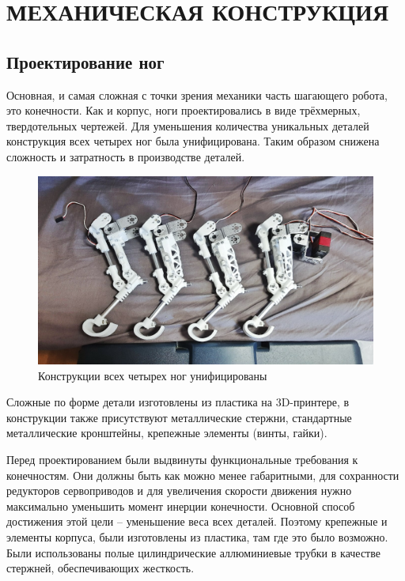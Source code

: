 \chapter{\MakeUppercase{Механическая конструкция}}
\section{Проектирование ног} \label{sec:leg_design}
Основная, и самая сложная с точки зрения механики часть шагающего робота, это конечности. Как и корпус, ноги проектировались в виде трёхмерных, твердотельных чертежей. Для уменьшения количества уникальных деталей конструкция всех четырех ног была унифицирована. Таким образом снижена сложность и затратность в производстве деталей. 

\begin{figure}[h]
    \centering
    \includegraphics[width=\textwidth]{chapter_mechanics_construction/figure11.jpg}
    \caption{Конструкции всех четырех ног унифицированы}
    \label{}
\end{figure}

Сложные по форме детали изготовлены из пластика на 3D-принтере, в конструкции также присутствуют металлические стержни, стандартные металлические кронштейны, крепежные элементы (винты, гайки).

Перед проектированием были выдвинуты функциональные требования к конечностям. Они должны быть как можно менее габаритными, для сохранности редукторов сервоприводов и для увеличения скорости движения нужно максимально уменьшить момент инерции конечности. Основной способ достижения этой цели -- уменьшение веса всех деталей. Поэтому крепежные и элементы корпуса, были изготовлены из пластика, там где это было возможно. Были использованы полые цилиндрические аллюминиевые трубки в качестве стержней, обеспечивающих жесткость.

